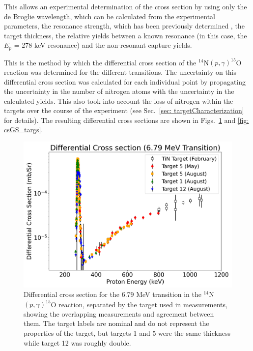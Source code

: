 \noindent This allows an experimental determination of the cross section by using only the de Broglie wavelength, which can be calculated from the experimental parameters, the resonance strength, which has been previously determined \cite{Imbriani2005, Daigle2016}, the target thickness, the relative yields between a known resonance (in this case, the $E_{p}$ = 278 keV resonance) and the non-resonant capture yields. 


This is the method by which the differential cross section of the $^{14}$N$\left( p,\gamma \right) ^{15}$O reaction was determined for the different transitions. The uncertainty on this differential cross section was calculated for each individual point by propagating the uncertainty in the number of nitrogen atoms with the uncertainty in the calculated yields. This also took into account the loss of nitrogen within the targets over the course of the experiment (see Sec.\ \ref{sec: targetCharacterization} for details). The resulting differential cross sections are shown in Figs.\ \ref{fig: cs679_targs} and \ref{fig: csGS_targs}. 



\begin{figure}
		\includegraphics[width=1.0\linewidth]{figures/cs679_targs.png}
	\caption{Differential cross section for the 6.79 MeV transition in the $^{14}$N$\left( p,\gamma \right) ^{15}$O reaction, separated by the target used in measurements, showing the overlapping measurements and agreement between them. The target labels are nominal and do not represent the properties of the target, but targets 1 and 5 were the same thickness while target 12 was roughly double.}
	\label{fig: cs679_targs}
\end{figure}

